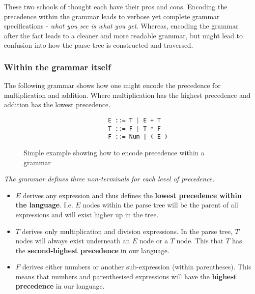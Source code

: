These two schools of thought each have their pros and cons. Encoding the precedence within the grammar leads to verbose yet complete grammar specifications - \textit{what you see is what you get}. Whereas, encoding the grammar after the fact leads to a cleaner and more readable grammar, but might lead to confusion into how the parse tree is constructed and traversed.

\subsubsection{Within the grammar itself}

The following grammar shows how one might encode the precedence for multiplication and addition. Where multiplication has the highest precedence and addition has the lowest precedence.

\begin{figure}[H]
    \begin{center}
        \begin{verbatim}            
                        E ::= T | E + T
                        T ::= F | T * F
                        F ::= Num | ( E )
        \end{verbatim}
    \end{center}
    \vspace{-1.5em}
    \caption{\label{fig:4.5}Simple example showing how to encode precedence within a grammar}
\end{figure}

\begin{center}
    \textit{The grammar defines three non-terminals for each level of precedence.}
    \begin{itemize}
        \item $E$ derives any expression and thus defines the \textbf{lowest precedence within the language}. I.e. $E$ nodes within the parse tree will be the parent of all expressions and will exist higher up in the tree.
        \item $T$ derives only multiplication and division expressions. In the parse tree, $T$ nodes will always exist underneath an $E$ node or a $T$ node. This that $T$ has the \textbf{second-highest precedence} in our language.
        \item $F$ derives either numbers or another sub-expression (within parentheses). This means that numbers and parenthesised expressions will have the \textbf{highest precedence} in our language.\textsuperscript{\cite{abrahamson_2021}\cite{norvell_1999}}
    \end{itemize}
\end{center}

